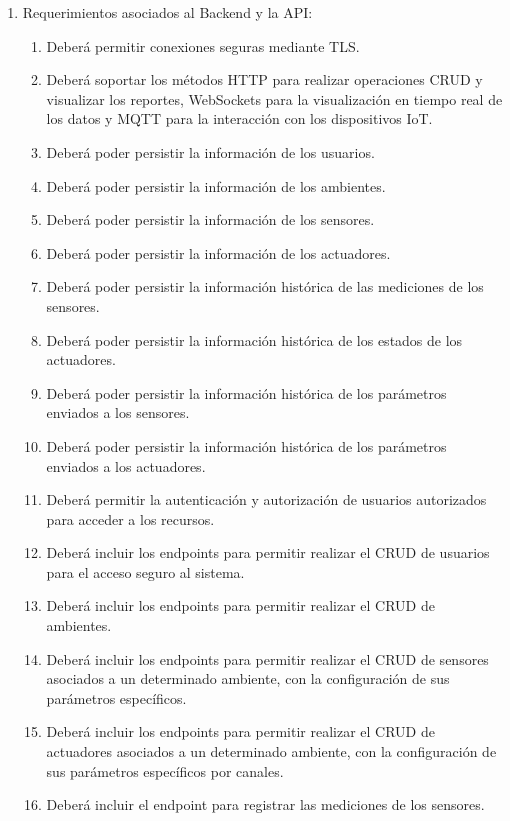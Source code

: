 \begin{enumerate}
	\item Requerimientos asociados al Backend y la API:
	      \begin{enumerate}
		      \item Deberá permitir conexiones seguras mediante TLS.
		      \item Deberá soportar los métodos HTTP para realizar operaciones CRUD y visualizar los reportes, WebSockets
		            para la visualización en tiempo real de los datos y MQTT para la interacción con
		            los dispositivos IoT.
			  \item Deberá poder persistir la información de los usuarios.
			  \item Deberá poder persistir la información de los ambientes.
			  \item Deberá poder persistir la información de los sensores.
			  \item Deberá poder persistir la información de los actuadores.
			  \item Deberá poder persistir la información histórica de las mediciones de los sensores.
			  \item Deberá poder persistir la información histórica de los estados de los actuadores.
			  \item Deberá poder persistir la información histórica de los parámetros enviados a los sensores.
			  \item Deberá poder persistir la información histórica de los parámetros enviados a los actuadores.
		      \item Deberá permitir la autenticación y autorización de usuarios autorizados para
		            acceder a los recursos.
		      \item Deberá incluir los endpoints para permitir realizar el CRUD de usuarios para el
		            acceso seguro al sistema.
		      \item Deberá incluir los endpoints para permitir realizar el CRUD de ambientes.
		      \item Deberá incluir los endpoints para permitir realizar el CRUD de sensores
		            asociados a un determinado ambiente, con la configuración de sus parámetros
		            específicos.
		      \item Deberá incluir los endpoints para permitir realizar el CRUD de actuadores
		            asociados a un determinado ambiente, con la configuración de sus parámetros
		            específicos por canales.
		      \item Deberá incluir el endpoint para registrar las mediciones de los sensores.

\end{enumerate}
\end{enumerate}
